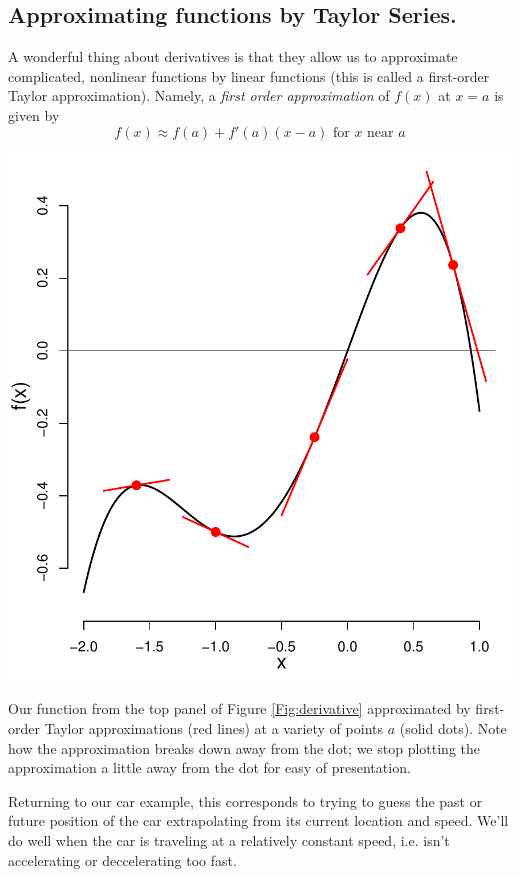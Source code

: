 \subsection{Approximating functions by Taylor Series.} \label{Appendix:taylor_series}
A wonderful thing about derivatives is that they allow us to approximate
complicated, nonlinear functions by linear functions (this is called a first-order
  Taylor approximation). Namely, a
\emph{first order approximation} of $f(x)$ at $x=a$ is given by 
\begin{equation}
  f(x) \approx f(a)+f'(a)(x-a) \mbox{ for $x$ near $a$}
  \end{equation}
 \begin{marginfigure}
 \begin{center}
   \includegraphics[width=\textwidth]{math_background/calc_pics/Taylor_1.pdf}\end{center}
 \caption{Our function from the top panel of Figure
   \ref{Fig:derivative} approximated by first-order Taylor
   approximations (red lines) at a variety of points $a$ (solid
   dots). Note how the approximation breaks down away from the dot; we
   stop plotting the approximation a little away from the dot for easy
   of presentation. }\label{FigTaylor_1}
\end{marginfigure}
Returning to our car example, this corresponds to trying to guess the
past or future position of the car
extrapolating from its current location and speed. We'll do well when
the car is traveling at a relatively constant speed, i.e. isn't
accelerating or deccelerating too fast. 

